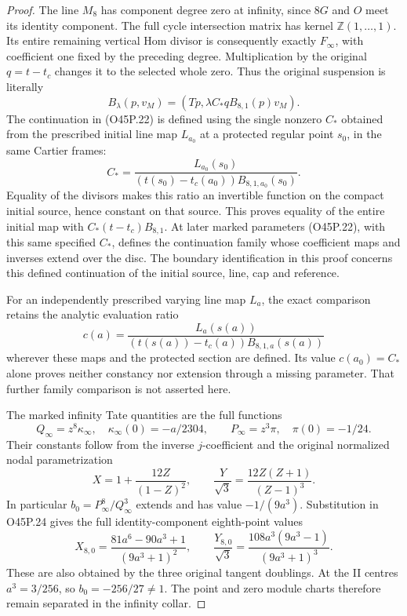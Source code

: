 \begin{proof}
The line \(M_8\) has component degree zero at infinity, since
\(8G\) and \(O\) meet its identity component. The full cycle
intersection matrix has kernel
\(\mathbb Z(1,\ldots,1)\). Its entire remaining vertical
Hom divisor is consequently exactly \(F_\infty\), with
coefficient one fixed by the preceding degree. Multiplication
by the original \(q=t-t_c\) changes it to the selected whole
zero. Thus the original suspension is literally
\[
 B_\lambda(p,v_M)=
       (Tp,\lambda C_*q B_{8,1}(p)v_M).
 \tag{O45P.22}
\]
The continuation in (O45P.22) is defined using the single
nonzero \(C_*\) obtained from the prescribed initial line map
\(L_{a_0}\) at a protected regular point \(s_0\), in the same
Cartier frames:
\[
 C_*=
 \frac{L_{a_0}(s_0)}
 {(t(s_0)-t_c(a_0))B_{8,1,a_0}(s_0)}.
\]
Equality of the divisors makes this ratio an invertible function
on the compact initial source, hence constant on that source.
This proves equality of the entire initial map with
\(C_*(t-t_c)B_{8,1}\). At later marked parameters (O45P.22),
with this same specified \(C_*\), defines the continuation
family whose coefficient maps and inverses extend over the disc.
The boundary identification in this proof concerns this defined
continuation of the initial source, line, cap and reference.

For an independently prescribed varying line map \(L_a\), the
exact comparison retains the analytic evaluation ratio
\[
 c(a)=\frac{L_a(s(a))}
 {(t(s(a))-t_c(a))B_{8,1,a}(s(a))}
\]
wherever these maps and the protected section are defined. Its value
\(c(a_0)=C_*\) alone proves neither constancy nor extension
through a missing parameter. That further family comparison
is not asserted here.

The marked infinity Tate quantities are the full functions
\[
 Q_\infty=z^8\kappa_\infty,\quad
 \kappa_\infty(0)=-a/2304,\qquad
 P_\infty=z^3\pi,\quad \pi(0)=-1/24.
 \tag{O45P.23}
\]
Their constants follow from the inverse \(j\)-coefficient and
the original normalized nodal parametrization
\[
 X=1+\frac{12Z}{(1-Z)^2},\qquad
 \frac Y{\sqrt3}=\frac{12Z(Z+1)}{(Z-1)^3}.
 \tag{O45P.24}
\]
In particular \(b_0=P_\infty^8/Q_\infty^3\) extends and has value
\(-1/(9a^3)\). Substitution in O45P.24 gives the full
identity-component eighth-point values
\[
 X_{8,0}=\frac{81a^6-90a^3+1}{(9a^3+1)^2},\qquad
 \frac{Y_{8,0}}{\sqrt3}
      =\frac{108a^3(9a^3-1)}{(9a^3+1)^3}.
 \tag{O45P.25}
\]
These are also obtained by the three original tangent doublings.
At the II centres \(a^3=3/256\), so \(b_0=-256/27\ne1\).
The point and zero module charts therefore remain separated in
the infinity collar.


\end{proof}
